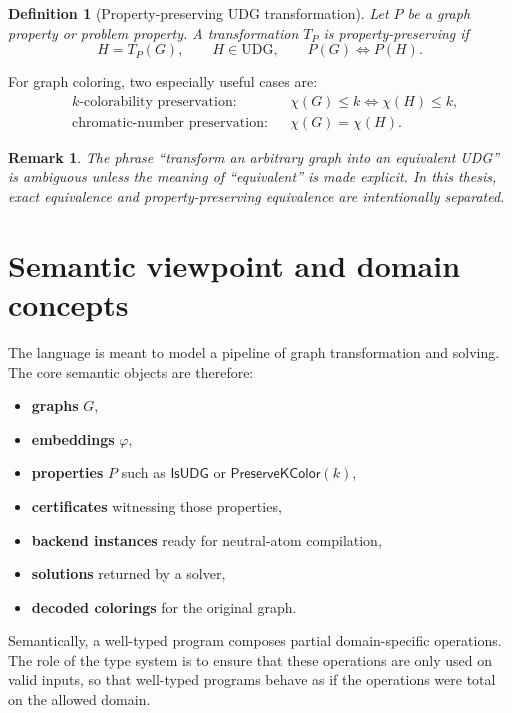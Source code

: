 \documentclass[11pt]{article}
\newtheorem{definition}{Definition}
\newtheorem{remark}{Remark}
\newcommand{\UDG}{\mathrm{UDG}}
\begin{document}
\begin{definition}[Property-preserving UDG transformation]
Let $P$ be a graph property or problem property. A transformation $T_P$ is property-preserving if
\[
H = T_P(G),
\qquad
H\in \UDG,
\qquad
P(G) \iff P(H).
\]
\end{definition}

For graph coloring, two especially useful cases are:
\begin{align*}
&\text{$k$-colorability preservation:}
&& \chi(G)\le k \iff \chi(H)\le k,\\[2mm]
&\text{chromatic-number preservation:}
&& \chi(G)=\chi(H).
\end{align*}

\begin{remark}
The phrase ``transform an arbitrary graph into an equivalent UDG'' is ambiguous unless the meaning of ``equivalent'' is made explicit. In this thesis, exact equivalence and property-preserving equivalence are intentionally separated.
\end{remark}

\section{Semantic viewpoint and domain concepts}

The language is meant to model a pipeline of graph transformation and solving. The core semantic objects are therefore:
\begin{itemize}
    \item \textbf{graphs} $G$,
    \item \textbf{embeddings} $\varphi$,
    \item \textbf{properties} $P$ such as $\mathsf{IsUDG}$ or $\mathsf{PreserveKColor}(k)$,
    \item \textbf{certificates} witnessing those properties,
    \item \textbf{backend instances} ready for neutral-atom compilation,
    \item \textbf{solutions} returned by a solver,
    \item \textbf{decoded colorings} for the original graph.
\end{itemize}

Semantically, a well-typed program composes partial domain-specific operations. The role of the type system is to ensure that these operations are only used on valid inputs, so that well-typed programs behave as if the operations were total on the allowed domain.
\end{document}
